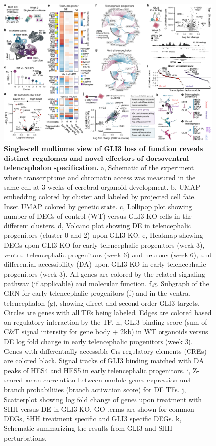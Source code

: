 \begin{figure}[b!]
    \centering
	\includegraphics[width=\textwidth]{figures/pando/Figure_4}
    \caption{\textbf{Single-cell multiome view of GLI3 loss of function reveals distinct regulomes and novel effectors of dorsoventral telencephalon specification.}
    a, Schematic of the experiment where transcriptome and chromatin access was measured in the same cell at 3 weeks of cerebral organoid development. b, UMAP embedding colored by cluster and labeled by projected cell fate. Inset UMAP colored by genetic state. c, Lollipop plot showing number of DEGs of control (WT) versus GLI3 KO cells in the different clusters. d, Volcano plot showing DE in telencephalic progenitors (cluster 0 and 2) upon GLI3 KO. e, Heatmap showing DEGs upon GLI3 KO for early telencephalic progenitors (week 3), ventral telencephalic progenitors (week 6) and neurons (week 6), and differential accessibility (DA) upon GLI3 KO in early telencephalic progenitors (week 3). All genes are colored by the related signaling pathway (if applicable) and molecular function. f,g, Subgraph of the GRN for early telencephalic progenitors (f) and in the ventral telencephalon (g), showing direct and second-order GLI3 targets. Circles are genes with all TFs being labeled. Edges are colored based on regulatory interaction by the TF. h, GLI3 binding score (sum of C\&T signal intensity for gene body + 2kb) in WT organoids versus DE log fold change in early telencephalic progenitors (week 3). Genes with differentially accessible Cis-regulatory elements (CREs) are colored black. Signal tracks of GLI3 binding matched with DA peaks of HES4 and HES5 in early telencephalic progenitors. i, Z-scored mean correlation between module genes expression and branch probabilities (branch activation score) for DE TFs. j, Scatterplot showing log fold change of genes upon treatment with SHH versus DE in GLI3 KO. GO terms are shown for common DEGs, SHH treatment specific and GLI3 specific DEGs. k, Schematic summarizing the results from GLI3 and SHH perturbations.}
    \label{fig:reg4}
\end{figure}


